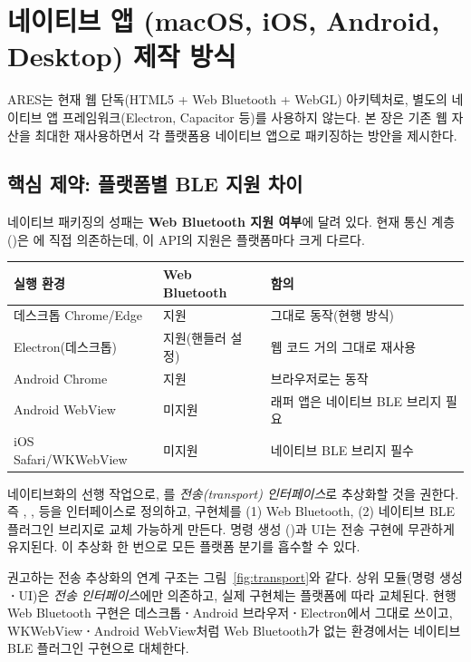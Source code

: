 \section{네이티브 앱 (macOS, iOS, Android, Desktop) 제작 방식}

ARES는 현재 웹 단독(HTML5 + Web Bluetooth + WebGL) 아키텍처로, 별도의
네이티브 앱 프레임워크(Electron, Capacitor 등)를 사용하지 않는다. 본 장은
기존 웹 자산을 최대한 재사용하면서 각 플랫폼용 네이티브 앱으로 패키징하는
방안을 제시한다.

\subsection{핵심 제약: 플랫폼별 BLE 지원 차이}

네이티브 패키징의 성패는 \textbf{Web Bluetooth 지원 여부}에 달려 있다.
현재 통신 계층()은 에 직접
의존하는데, 이 API의 지원은 플랫폼마다 크게 다르다.

\begin{longtable}{L{3.4cm} L{4.0cm} L{6.6cm}}
\toprule
{}\textbf{실행 환경} & \textbf{Web Bluetooth} & \textbf{함의} \\
\midrule
\endhead
데스크톱 Chrome/Edge & 지원 & 그대로 동작(현행 방식) \\
Electron(데스크톱) & 지원(핸들러 설정) & 웹 코드 거의 그대로 재사용 \\
Android Chrome & 지원 & 브라우저로는 동작 \\
Android WebView & 미지원 & 래퍼 앱은 네이티브 BLE 브리지 필요 \\
iOS Safari/WKWebView & 미지원 & 네이티브 BLE 브리지 필수 \\
\bottomrule
\end{longtable}

\begin{infobox}[title=설계 권고: 통신 계층 추상화]
네이티브화의 선행 작업으로, 를 \emph{전송(transport)
인터페이스}로 추상화할 것을 권한다. 즉 , ,
 등을 인터페이스로 정의하고, 구현체를 (1) Web Bluetooth,
(2) 네이티브 BLE 플러그인 브리지로 교체 가능하게 만든다. 명령 생성
()과 UI는 전송 구현에 무관하게 유지된다.
이 추상화 한 번으로 모든 플랫폼 분기를 흡수할 수 있다.
\end{infobox}

권고하는 전송 추상화의 연계 구조는 그림~\ref{fig:transport}와 같다. 상위
모듈(명령 생성\textbf{·}UI)은 \emph{전송 인터페이스}에만 의존하고, 실제 구현체는
플랫폼에 따라 교체된다. 현행 Web Bluetooth 구현은 데스크톱\textbf{·}Android
브라우저\textbf{·}Electron에서 그대로 쓰이고, WKWebView\textbf{·}Android WebView처럼
Web Bluetooth가 없는 환경에서는 네이티브 BLE 플러그인 구현으로 대체한다.

